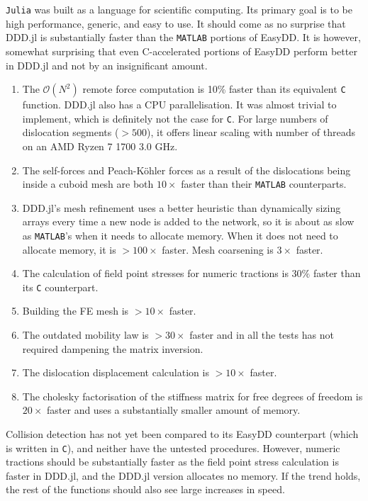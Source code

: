 \texttt{Julia} was built as a language for scientific computing. Its primary goal is to be high performance, generic, and easy to use. It should come as no surprise that DDD.jl is substantially faster than the \texttt{MATLAB} portions of EasyDD. It is however, somewhat surprising that even C-accelerated portions of EasyDD perform better in DDD.jl and not by an insignificant amount.
\begin{enumerate}
    \item The $\mathcal{O}(N^2)$ remote force computation is 10\% faster than its equivalent \texttt{C} function. DDD.jl also has a CPU parallelisation. It was almost trivial to implement, which is definitely not the case for \texttt{C}. For large numbers of dislocation segments ($>500$), it offers linear scaling with number of threads on an AMD Ryzen 7 1700 \@ 3.0 GHz.
    \item The self-forces and Peach-K\"{o}hler forces as a result of the dislocations being inside a cuboid mesh are both $10\times$ faster than their \texttt{MATLAB} counterparts.
    \item DDD.jl's mesh refinement uses a better heuristic than dynamically sizing arrays every time a new node is added to the network, so it is about as slow as \texttt{MATLAB}'s when it needs to allocate memory. When it does not need to allocate memory, it is $>100\times$ faster. Mesh coarsening is $3\times$ faster.
    \item The calculation of field point stresses for numeric tractions is $30\%$ faster than its \texttt{C} counterpart.
    \item Building the FE mesh is $>10\times$ faster.
    \item The outdated mobility law is $>30\times$ faster and in all the tests has not required dampening the matrix inversion.
    \item The dislocation displacement calculation is $>10\times$ faster.
    \item The cholesky factorisation of the stiffness matrix for free degrees of freedom is $20\times$ faster and uses a substantially smaller amount of memory.
\end{enumerate}
Collision detection has not yet been compared to its EasyDD counterpart (which is written in \texttt{C}), and neither have the untested procedures. However, numeric tractions should be substantially faster as the field point stress calculation is faster in DDD.jl, and the DDD.jl version allocates no memory. If the trend holds, the rest of the functions should also see large increases in speed.

